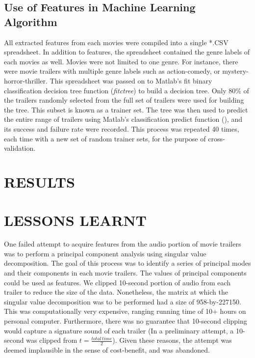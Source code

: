 \documentclass[letterpaper, 10 pt, conference]{ieeeconf}  %
\begin{document}
\subsection{Use of Features in Machine Learning Algorithm}
All extracted features from each movies were compiled into a single *.CSV spreadsheet. In addition to features, the spreadsheet contained the genre labels of each movies as well. Movies were not limited to one genre. For instance, there were movie trailers with multiple genre labels such as action-comedy, or mystery-horror-thriller. This spreadsheet was passed on to Matlab's fit binary classification decision tree function (\textit{fitctree}) to build a decision tree. Only 80\% of the trailers randomly selected from the full set of trailers were used for building the tree. This subset is known as a trainer set. The tree was then used to predict the entire range of trailers using Matlab's classification predict function (), and its success and failure rate were recorded. This process was repeated 40 times, each time with a new set of random trainer sets, for the purpose of cross-validation. 



\section{RESULTS}



\section{LESSONS LEARNT}
One failed attempt to acquire features from the audio portion of movie trailers was to perform a principal component analysis using singular value decomposition. The goal of this process was to identify a series of principal modes and their components in each movie trailers. The values of principal components could be used as features. We clipped  10-second portion of audio from each trailer to reduce the size of the data. Nonetheless, the matrix at which the singular value decomposition was to be performed had a size of 958-by-227150. This was computationally very expensive, ranging running time of 10+ hours on personal computer. Furthermore, there was no guarantee that 10-second clipping would capture a signature sound of each trailer (In a preliminary attempt, a 10-second was clipped from $t=\frac{total\, time}{2}$). Given these reasons, the attempt was deemed implausible in the sense of cost-benefit, and was abandoned.
\end{document}
